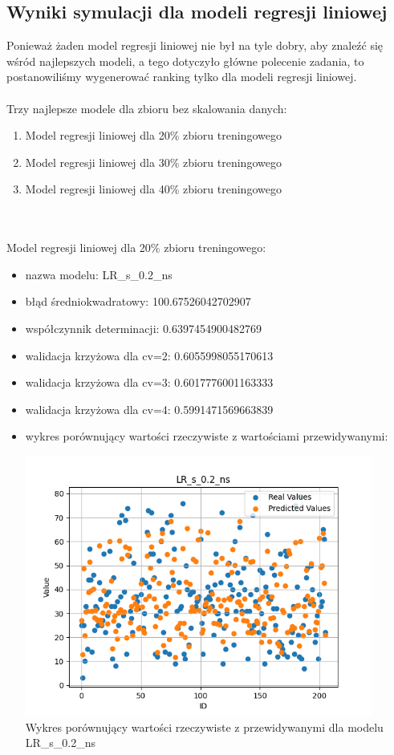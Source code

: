 \documentclass[11pt, a4paper, notitlepage]{report}
\begin{document}
\subsection{Wyniki symulacji dla modeli regresji liniowej}
Ponieważ żaden model regresji liniowej nie był na tyle dobry, aby znaleźć się wśród najlepszych modeli, a tego dotyczyło główne polecenie zadania, to postanowiliśmy wygenerować ranking tylko dla modeli regresji liniowej.
\\ \\
Trzy najlepsze modele dla zbioru bez skalowania danych:
\begin{enumerate}
	\item Model regresji liniowej dla 20\% zbioru treningowego
	\item Model regresji liniowej dla 30\% zbioru treningowego
	\item Model regresji liniowej dla 40\% zbioru treningowego
\end{enumerate}
\\ \\
Model regresji liniowej dla 20\% zbioru treningowego:
\begin{itemize}
	\item nazwa modelu: LR\_s\_0.2\_ns
	\item błąd średniokwadratowy: 100.67526042702907
	\item współczynnik determinacji: 0.6397454900482769
	\item walidacja krzyżowa dla cv=2: 0.6055998055170613
	\item walidacja krzyżowa dla cv=3: 0.6017776001163333
	\item walidacja krzyżowa dla cv=4: 0.5991471569663839
	\item wykres porównujący wartości rzeczywiste z wartościami przewidywanymi: \begin{center} \small
		\includegraphics[width=0.9\textwidth]{graphics/plots/LR_s_0.2_ns.png} \\
		\caption{Wykres porównujący wartości rzeczywiste z przewidywanymi dla modelu LR\_s\_0.2\_ns}
	\end{center}
	\end{itemize}
\end{document}
